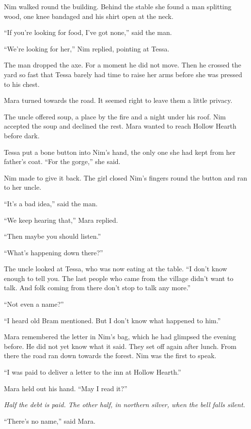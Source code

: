 \documentclass[10pt,a4paper]{article}
\begin{document}
Nim walked round the building. Behind the stable she found a man splitting wood, one knee bandaged and his shirt open at the neck.

“If you're looking for food, I've got none,” said the man.

“We're looking for her,” Nim replied, pointing at Tessa.

The man dropped the axe. For a moment he did not move. Then he crossed the yard so fast that Tessa barely had time to raise her arms before she was pressed to his chest.

Mara turned towards the road. It seemed right to leave them a little privacy.

The uncle offered soup, a place by the fire and a night under his roof. Nim accepted the soup and declined the rest. Mara wanted to reach Hollow Hearth before dark.

Tessa put a bone button into Nim's hand, the only one she had kept from her father's coat. “For the gorge,” she said.

Nim made to give it back. The girl closed Nim's fingers round the button and ran to her uncle.

“It's a bad idea,” said the man.

“We keep hearing that,” Mara replied.

“Then maybe you should listen.”

“What's happening down there?”

The uncle looked at Tessa, who was now eating at the table. “I don't know enough to tell you. The last people who came from the village didn't want to talk. And folk coming from there don't stop to talk any more.”

“Not even a name?”

“I heard old Bram mentioned. But I don't know what happened to him.”

Mara remembered the letter in Nim's bag, which he had glimpsed the evening before. He did not yet know what it said.
They set off again after lunch. From there the road ran down towards the forest. Nim was the first to speak.

“I was paid to deliver a letter to the inn at Hollow Hearth.”

Mara held out his hand. “May I read it?”

\emph{Half the debt is paid. The other half, in northern silver, when the bell falls silent.}

“There's no name,” said Mara.
\end{document}

